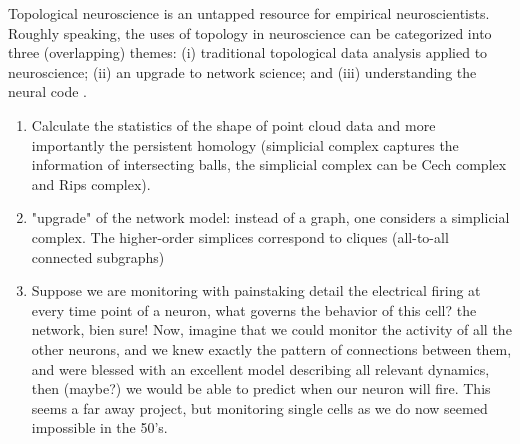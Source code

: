 \documentclass[onecollarge,runningheads]{svjour2}
\begin{document}
Topological neuroscience is an untapped resource for empirical neuroscientists.
Roughly speaking, the uses of topology in neuroscience can be categorized into three (overlapping) themes: (i) traditional topological data analysis applied to neuroscience; (ii) an upgrade to network science; and (iii) understanding the neural code \cite{curto2016can}.

\begin{enumerate}
\item  Calculate the statistics of the shape of point cloud data and more importantly the persistent homology (simplicial complex captures the information of intersecting balls, the simplicial complex can be Cech complex and Rips complex).
\item  "upgrade" of the network model: instead of a graph, one considers a simplicial complex. The higher-order simplices correspond to cliques (all-to-all connected subgraphs)
\item Suppose we are monitoring with painstaking detail the electrical firing at every time point of a neuron, what governs the behavior of this cell? the network, bien sure!  Now, imagine that we could monitor the activity of all the other neurons, and we knew exactly the pattern of connections between them, and were blessed with an excellent model describing all relevant dynamics, then (maybe?) we would be able to predict when our neuron will fire. This seems a far away project, but monitoring  single cells as we do now seemed impossible in the 50's. %
\end{enumerate}



\begin{acknowledgements}

\end{acknowledgements}


\end{document}
